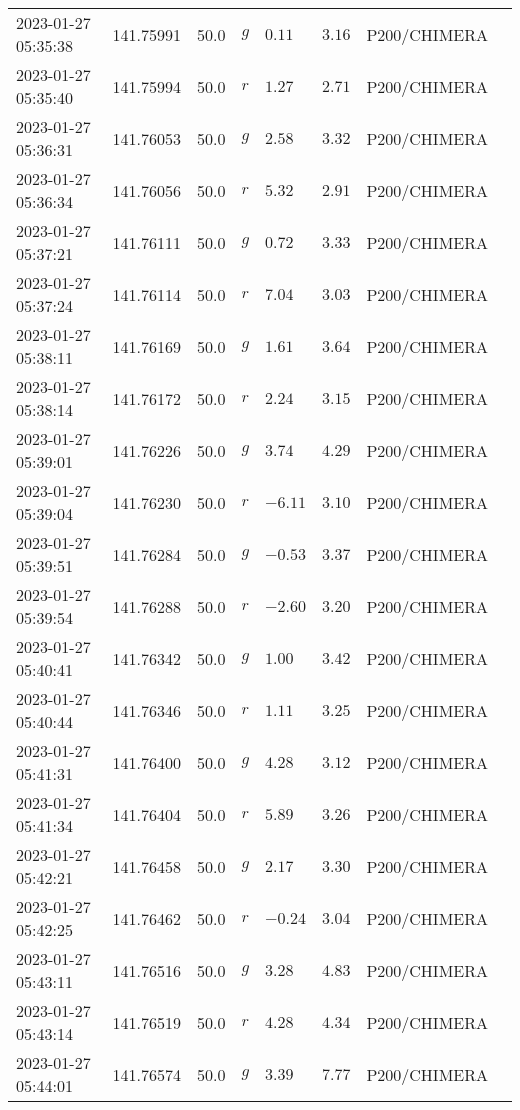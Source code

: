 \documentclass{nature_plusfigure}
\begin{document}
\begin{supplement}
\begin{center}
\begin{longtable}{llllllll}
2023-01-27 05:35:38 & 141.75991 & 50.0 & $g$ & $0.11$ & $3.16$ & P200/CHIMERA &  \\ 
2023-01-27 05:35:40 & 141.75994 & 50.0 & $r$ & $1.27$ & $2.71$ & P200/CHIMERA &  \\ 
2023-01-27 05:36:31 & 141.76053 & 50.0 & $g$ & $2.58$ & $3.32$ & P200/CHIMERA &  \\ 
2023-01-27 05:36:34 & 141.76056 & 50.0 & $r$ & $5.32$ & $2.91$ & P200/CHIMERA &  \\ 
2023-01-27 05:37:21 & 141.76111 & 50.0 & $g$ & $0.72$ & $3.33$ & P200/CHIMERA &  \\ 
2023-01-27 05:37:24 & 141.76114 & 50.0 & $r$ & $7.04$ & $3.03$ & P200/CHIMERA &  \\ 
2023-01-27 05:38:11 & 141.76169 & 50.0 & $g$ & $1.61$ & $3.64$ & P200/CHIMERA &  \\ 
2023-01-27 05:38:14 & 141.76172 & 50.0 & $r$ & $2.24$ & $3.15$ & P200/CHIMERA &  \\ 
2023-01-27 05:39:01 & 141.76226 & 50.0 & $g$ & $3.74$ & $4.29$ & P200/CHIMERA &  \\ 
2023-01-27 05:39:04 & 141.76230 & 50.0 & $r$ & $-6.11$ & $3.10$ & P200/CHIMERA &  \\ 
2023-01-27 05:39:51 & 141.76284 & 50.0 & $g$ & $-0.53$ & $3.37$ & P200/CHIMERA &  \\ 
2023-01-27 05:39:54 & 141.76288 & 50.0 & $r$ & $-2.60$ & $3.20$ & P200/CHIMERA &  \\ 
2023-01-27 05:40:41 & 141.76342 & 50.0 & $g$ & $1.00$ & $3.42$ & P200/CHIMERA &  \\ 
2023-01-27 05:40:44 & 141.76346 & 50.0 & $r$ & $1.11$ & $3.25$ & P200/CHIMERA &  \\ 
2023-01-27 05:41:31 & 141.76400 & 50.0 & $g$ & $4.28$ & $3.12$ & P200/CHIMERA &  \\ 
2023-01-27 05:41:34 & 141.76404 & 50.0 & $r$ & $5.89$ & $3.26$ & P200/CHIMERA &  \\ 
2023-01-27 05:42:21 & 141.76458 & 50.0 & $g$ & $2.17$ & $3.30$ & P200/CHIMERA &  \\ 
2023-01-27 05:42:25 & 141.76462 & 50.0 & $r$ & $-0.24$ & $3.04$ & P200/CHIMERA &  \\ 
2023-01-27 05:43:11 & 141.76516 & 50.0 & $g$ & $3.28$ & $4.83$ & P200/CHIMERA &  \\ 
2023-01-27 05:43:14 & 141.76519 & 50.0 & $r$ & $4.28$ & $4.34$ & P200/CHIMERA &  \\ 
2023-01-27 05:44:01 & 141.76574 & 50.0 & $g$ & $3.39$ & $7.77$ & P200/CHIMERA &  \\ 

\end{longtable}
\end{center}
\end{supplement}
\end{document}

